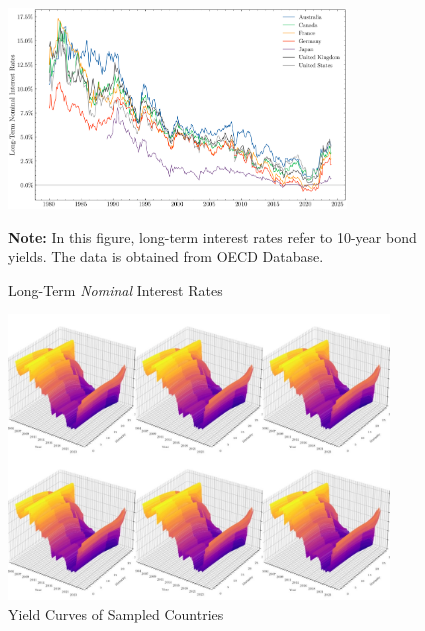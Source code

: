 \begin{figure}[H]
    \centering
    \caption{Long-Term \textit{Nominal} Interest Rates}
    \includegraphics[width=0.8\textwidth]{figures/long-term-rates.png}
    
    \vspace{15pt}
    
    \begin{minipage}{\textwidth}
        \footnotesize %
        \textbf{Note:} In this figure, long-term interest rates refer to 10-year bond yields. The data is obtained from OECD Database.
    \end{minipage}
    \label{fig:long-term-rates}
\end{figure}

\begin{figure}[H]
    \centering
    \caption{Yield Curves of Sampled Countries}
    \includegraphics[width=0.9\textwidth]{figures/ycs.jpg}
\end{figure}
